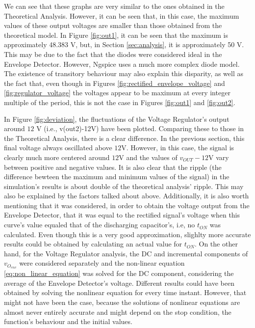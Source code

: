 We can see that these graphs are very similar to the ones obtained in the Theoretical Analysis. However, it can be seen that, in this case, the maximum values of these output voltages are smaller than those obtained from the theoretical model. In Figure \ref{fig:out1}, it can be seen that the maximum is approximately 48.383 V, but, in Section \ref{sec:analysis}, it is approximately 50 V. This may be due to the fact that the diodes were considered ideal in the Envelope Detector. However, Ngspice uses a much more complex diode model. The existence of transitory behaviour may also explain this disparity, as well as the fact that, even though in Figures \ref{fig:rectified_envelope_voltage} and \ref{fig:regulator_voltage} the voltages appear to be maximum at every integer multiple of the period, this is not the case in Figures \ref{fig:out1} and \ref{fig:out2}.
\par
In Figure \ref{fig:deviation}, the fluctuations of the Voltage Regulator's output around $12$ V (i.e., v(out2)-12V) have been plotted. Comparing these to those in the Theoretical Analysis, there is a clear difference. In the previous section, this final voltage always oscillated above $12$V. However, in this case, the signal is clearly much more centered around $12$V and the values of $v_{OUT}-12$V vary between positive and negative values. It is also clear that the ripple (the difference bewteen the maximum and minimum values of the signal) in the simulation's results is about double of the theoretical analysis' ripple. This may also be explained by the factors talked about above. Additionally, it is also worth mentioning that it was considered, in order to obtain the voltage output from the Envelope Detector, that it was equal to the rectified signal's voltage when this curve's value equaled that of the discharging capacitor's, i.e, no $t_{ON}$ was calculated. Even though this is a very good approximation, slighlty more accurate results could be obtained by calculating an actual value for $t_{ON}$. On the other hand, for the Voltage Regulator analysis, the DC and incremental components of $v_{O_{env}}$ were considered separately and the non-linear equation \ref{eq:non_linear_equation} was solved for the DC component, considering the average of the Envelope Detector's voltage. Different results could have been obtained by solving the nonlinear equation for every time instant. However, that might not have been the case, because the solutions of nonlinear equations are almost never entirely accurate and might depend on the stop condition, the function's behaviour and the initial values. 

